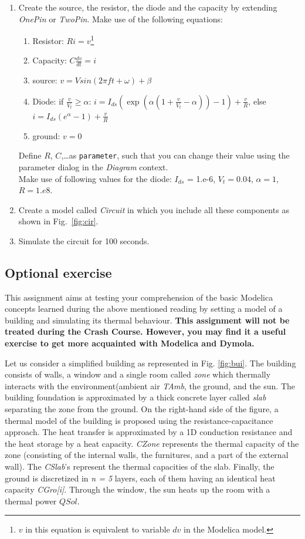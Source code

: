 \documentclass[10pt,a4paper]{article}
\begin{document}
\begin{enumerate}
	\item Create the source, the resistor, the diode and the capacity by extending \textit{OnePin} or \textit{TwoPin}. Make use of the following equations:
	\begin{enumerate}
		\item Resistor: $R i = v$\footnote{$v$ in this equation is equivalent to variable $dv$ in the Modelica model.}
		\item Capacity: $C \frac{d v}{dt} = i$
		\item source: $v = V sin( 2 \pi f t + \omega) + \beta$
		\item Diode: if $ \frac{v}{V_t} \geq \alpha$: $i = I_{ds} \left( \exp\left(\alpha \left( 1 + \frac{v}{V_t} - \alpha \right)\right) - 1\right) + \frac{v}{R}$, else $i = I_{ds} (e^\alpha - 1) + \frac{v}{R}$
		\item ground: $ v = 0$
	\end{enumerate}
	Define $R$, $C$,\ldots as \texttt{parameter}, such that you can change their value using the parameter dialog in the \textit{Diagram} context.\\
	Make use of following values for the diode: $I_{ds}$ = 1.e-6, $V_t=0.04$, $\alpha=1$, $R=1.e8$.
	\item Create a model called \textit{Circuit} in which you include all these components as shown in Fig.~\ref{fig:cir}.
	\item Simulate the circuit for 100 seconds.
\end{enumerate}

\subsection*{Optional exercise}
This assignment aims at testing your comprehension of the basic Modelica concepts learned during the above mentioned reading by setting a model of a building and simulating its thermal behaviour. \textbf{This assignment will not be treated during the Crash Course. However, you may find it a useful exercise to get more acquainted with Modelica and Dymola.}

Let us consider a simplified building as represented in Fig. \ref{fig:bui}. The building consists of  walls, a window and a single room called \textit{zone} which thermally interacts with the environment(ambient air \textit{TAmb}, the ground, and the sun. The building foundation is approximated by a thick concrete layer called \textit{slab} separating the zone from the ground. On the right-hand side of the figure, a thermal model of the building is proposed using the resistance-capacitance approach. The heat transfer is approximated by a 1D conduction resistance and the heat storage by a heat capacity. \textit{CZone} represents the thermal capacity of the zone (consisting of the internal walls, the furnitures, and a part of the external wall). The \textit{CSlab}'s represent the thermal capacities of the slab. Finally, the ground is discretized in \textit{n = 5} layers, each of them having an identical heat capacity \textit{CGro[i]}. Through the window, the sun heats up the room with a thermal power $QSol$. 
\end{document}
